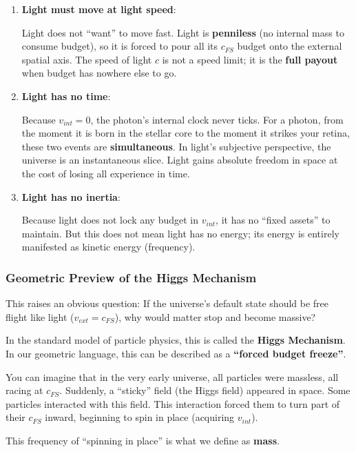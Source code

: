 \begin{enumerate}
\item \textbf{Light must move at light speed}:

    Light does not ``want'' to move fast. Light is \textbf{penniless} (no internal mass to consume budget), so it is forced to pour all its $c_{FS}$ budget onto the external spatial axis. The speed of light $c$ is not a speed limit; it is the \textbf{full payout} when budget has nowhere else to go.

\item \textbf{Light has no time}:

    Because $v_{int} = 0$, the photon's internal clock never ticks. For a photon, from the moment it is born in the stellar core to the moment it strikes your retina, these two events are \textbf{simultaneous}. In light's subjective perspective, the universe is an instantaneous slice. Light gains absolute freedom in space at the cost of losing all experience in time.

\item \textbf{Light has no inertia}:

    Because light does not lock any budget in $v_{int}$, it has no ``fixed assets'' to maintain. But this does not mean light has no energy; its energy is entirely manifested as kinetic energy (frequency).
\end{enumerate}

\subsubsection{Geometric Preview of the Higgs Mechanism}

This raises an obvious question: If the universe's default state should be free flight like light ($v_{ext} = c_{FS}$), why would matter stop and become massive?

In the standard model of particle physics, this is called the \textbf{Higgs Mechanism}. In our geometric language, this can be described as a \textbf{``forced budget freeze''}.

You can imagine that in the very early universe, all particles were massless, all racing at $c_{FS}$. Suddenly, a ``sticky'' field (the Higgs field) appeared in space. Some particles interacted with this field. This interaction forced them to turn part of their $c_{FS}$ inward, beginning to spin in place (acquiring $v_{int}$).

This frequency of ``spinning in place'' is what we define as \textbf{mass}.


